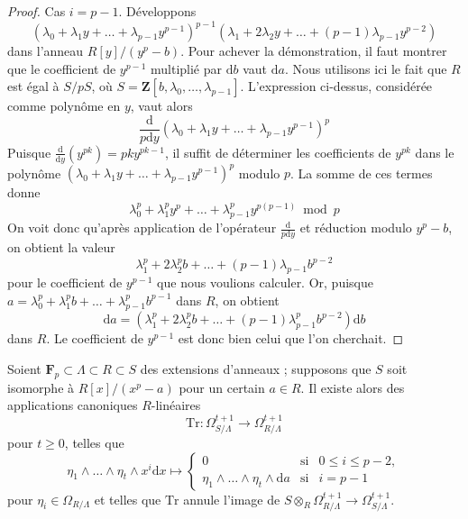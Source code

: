 \begin{proof}
\medskip\noindent Cas $i = p - 1$. Développons $$
(\lambda_0 + \lambda_1 y + \ldots + \lambda_{p - 1}y^{p - 1})^{p - 1}
(\lambda_1 + 2 \lambda_2 y + \ldots + (p - 1)\lambda_{p - 1}y^{p - 2})
$$ dans l'anneau $R[y]/(y^p - b)$. Pour achever la démonstration, il faut montrer que le coefficient de $y^{p - 1}$ multiplié par $\text{d}b$ vaut $\text{d}a$. Nous utilisons ici le fait que $R$ est égal à $S/pS$, où $S = \mathbf{Z}[b, \lambda_0, \ldots, \lambda_{p - 1}]$. L'expression ci-dessus, considérée comme polynôme en $y$, vaut alors $$
\frac{\text{d}}{p\text{d}y}
(\lambda_0 + \lambda_1 y + \ldots + \lambda_{p - 1}y^{p - 1})^p
$$ Puisque $\frac{\text{d}}{\text{d}y}(y^{pk}) = pk y^{pk - 1}$, il suffit de déterminer les coefficients de $y^{pk}$ dans le polynôme $(\lambda_0 + \lambda_1 y + \ldots + \lambda_{p - 1}y^{p - 1})^p$ modulo $p$. La somme de ces termes donne $$
\lambda_0^p + \lambda_1^py^p + \ldots + \lambda_{p - 1}^py^{p(p - 1)}
\bmod p
$$ On voit donc qu'après application de l'opérateur $\frac{\text{d}}{p\text{d}y}$ et réduction modulo $y^p - b$, on obtient la valeur $$
\lambda_1^p + 2\lambda_2^pb + \ldots + (p - 1)\lambda_{p - 1}b^{p - 2}
$$ pour le coefficient de $y^{p - 1}$ que nous voulions calculer. Or, puisque $a = \lambda_0^p + \lambda_1^p b + \ldots + \lambda_{p - 1}^pb^{p - 1}$ dans $R$, on obtient $$
\text{d}a = (\lambda_1^p  + 2 \lambda_2^p b + \ldots +
(p - 1) \lambda_{p - 1}^p b^{p - 2}) \text{d}b
$$ dans $R$. Le coefficient de $y^{p - 1}$ est donc bien celui que l'on cherchait. \end{proof}

\begin{lemma} \label{lemma-trace-higher} Soient $\mathbf{F}_p \subset \Lambda \subset R \subset S$ des extensions d'anneaux ; supposons que $S$ soit isomorphe à $R[x]/(x^p - a)$ pour un certain $a \in R$. Il existe alors des applications canoniques $R$-linéaires $$
\text{Tr} :
\Omega^{t + 1}_{S/\Lambda}
\longrightarrow
\Omega_{R/\Lambda}^{t + 1}
$$ pour $t \geq 0$, telles que $$
\eta_1 \wedge \ldots \wedge \eta_t \wedge x^i\text{d}x
\longmapsto
\left\{
\begin{matrix}
0 & \text{si} & 0 \leq i \leq p - 2, \\
\eta_1 \wedge \ldots \wedge \eta_t \wedge \text{d}a & \text{si} & i = p - 1
\end{matrix}
\right.
$$ pour $\eta_i \in \Omega_{R/\Lambda}$ et telles que $\text{Tr}$ annule l'image de $S \otimes_R \Omega_{R/\Lambda}^{t + 1} \to \Omega_{S/\Lambda}^{t + 1}$. \end{lemma}

